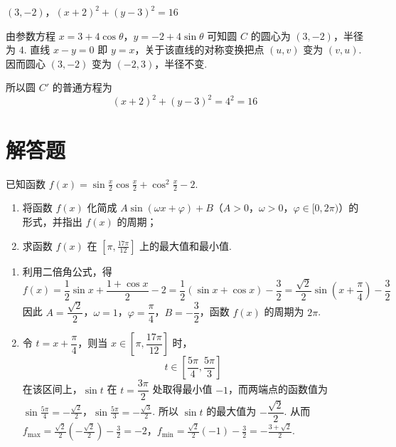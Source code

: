 \begin{answer}
\((3,-2)\)，\((x+2)^2+(y-3)^2=16\)
\end{answer}

\begin{solution}
由参数方程
\(x=3+4\cos\theta\)，\(y=-2+4\sin\theta\)
可知圆 \(C\) 的圆心为 \((3,-2)\)，半径为 \(4\). 直线 \(x-y=0\) 即 \(y=x\)，关于该直线的对称变换把点 \((u,v)\) 变为 \((v,u)\). 因而圆心 \((3,-2)\) 变为 \((-2,3)\)，半径不变.

所以圆 \(C'\) 的普通方程为
\[
(x+2)^2+(y-3)^2=4^2=16
\]
\end{solution}

\section{解答题}

\begin{problem}
已知函数 \( f(x) = \sin \frac{x}{2} \cos \frac{x}{2} + \cos^2 \frac{x}{2} - 2 \).
\begin{enumerate}
\item 将函数 \( f(x) \) 化简成 \( A\sin(\omega x + \varphi) + B \)（\(A > 0\)，\(\omega > 0\)，\(\varphi \in [0, 2\pi)\)）的形式，并指出 \( f(x) \) 的周期；
\item 求函数 \( f(x) \) 在 \( \left[\pi, \frac{17\pi}{12}\right] \) 上的最大值和最小值.
\end{enumerate}
\end{problem}

\begin{solution}
\begin{enumerate}
\item 利用二倍角公式，得
\[
f(x)=\frac{1}{2}\sin x+\frac{1+\cos x}{2}-2
=\frac{1}{2}(\sin x+\cos x)-\frac{3}{2}
=\frac{\sqrt{2}}{2}\sin\left(x+\frac{\pi}{4}\right)-\frac{3}{2}
\]
因此 \(A=\dfrac{\sqrt{2}}{2}\)，\(\omega=1\)，\(\varphi=\dfrac{\pi}{4}\)，\(B=-\dfrac{3}{2}\)，函数 \(f(x)\) 的周期为 \(2\pi\).

\item 令 \(t=x+\dfrac{\pi}{4}\)，则当 \(x\in\left[\pi,\dfrac{17\pi}{12}\right]\) 时，
\[
t\in\left[\frac{5\pi}{4},\frac{5\pi}{3}\right]
\]
在该区间上，\(\sin t\) 在 \(t=\dfrac{3\pi}{2}\) 处取得最小值 \(-1\)，而两端点的函数值为
\(\sin\frac{5\pi}{4}=-\frac{\sqrt{2}}{2}\)，\(\sin\frac{5\pi}{3}=-\frac{\sqrt{3}}{2}\).
所以 \(\sin t\) 的最大值为 \(-\dfrac{\sqrt{2}}{2}\). 从而
\(f_{\max}=\frac{\sqrt{2}}{2}\left(-\frac{\sqrt{2}}{2}\right)-\frac{3}{2}=-2\)，\(f_{\min}=\frac{\sqrt{2}}{2}(-1)-\frac{3}{2}=-\frac{3+\sqrt{2}}{2}\).
\end{enumerate}
\end{solution}

